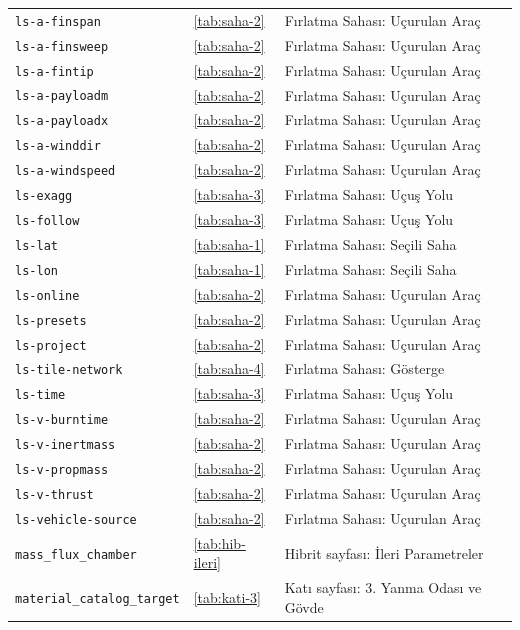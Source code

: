 \documentclass[11pt,a4paper]{article}
\begin{document}
{\begin{longtable}{@{}>{\raggedright\arraybackslash}p{5.2cm}p{1.4cm}>{\raggedright\arraybackslash}p{7.4cm}@{}}
\texttt{ls-a-finspan} & \ref{tab:saha-2} & Fırlatma Sahası: Uçurulan Araç \\
\texttt{ls-a-finsweep} & \ref{tab:saha-2} & Fırlatma Sahası: Uçurulan Araç \\
\texttt{ls-a-fintip} & \ref{tab:saha-2} & Fırlatma Sahası: Uçurulan Araç \\
\texttt{ls-a-payloadm} & \ref{tab:saha-2} & Fırlatma Sahası: Uçurulan Araç \\
\texttt{ls-a-payloadx} & \ref{tab:saha-2} & Fırlatma Sahası: Uçurulan Araç \\
\texttt{ls-a-winddir} & \ref{tab:saha-2} & Fırlatma Sahası: Uçurulan Araç \\
\texttt{ls-a-windspeed} & \ref{tab:saha-2} & Fırlatma Sahası: Uçurulan Araç \\
\texttt{ls-exagg} & \ref{tab:saha-3} & Fırlatma Sahası: Uçuş Yolu \\
\texttt{ls-follow} & \ref{tab:saha-3} & Fırlatma Sahası: Uçuş Yolu \\
\texttt{ls-lat} & \ref{tab:saha-1} & Fırlatma Sahası: Seçili Saha \\
\texttt{ls-lon} & \ref{tab:saha-1} & Fırlatma Sahası: Seçili Saha \\
\texttt{ls-online} & \ref{tab:saha-2} & Fırlatma Sahası: Uçurulan Araç \\
\texttt{ls-presets} & \ref{tab:saha-2} & Fırlatma Sahası: Uçurulan Araç \\
\texttt{ls-project} & \ref{tab:saha-2} & Fırlatma Sahası: Uçurulan Araç \\
\texttt{ls-tile-network} & \ref{tab:saha-4} & Fırlatma Sahası: Gösterge \\
\texttt{ls-time} & \ref{tab:saha-3} & Fırlatma Sahası: Uçuş Yolu \\
\texttt{ls-v-burntime} & \ref{tab:saha-2} & Fırlatma Sahası: Uçurulan Araç \\
\texttt{ls-v-inertmass} & \ref{tab:saha-2} & Fırlatma Sahası: Uçurulan Araç \\
\texttt{ls-v-propmass} & \ref{tab:saha-2} & Fırlatma Sahası: Uçurulan Araç \\
\texttt{ls-v-thrust} & \ref{tab:saha-2} & Fırlatma Sahası: Uçurulan Araç \\
\texttt{ls-vehicle-source} & \ref{tab:saha-2} & Fırlatma Sahası: Uçurulan Araç \\
\texttt{mass\_\allowbreak{}flux\_\allowbreak{}chamber} & \ref{tab:hib-ileri} & Hibrit sayfası: İleri Parametreler \\
\texttt{material\_\allowbreak{}catalog\_\allowbreak{}target} & \ref{tab:kati-3} & Katı sayfası: 3. Yanma Odası ve Gövde \\

\end{longtable}}
\end{document}

